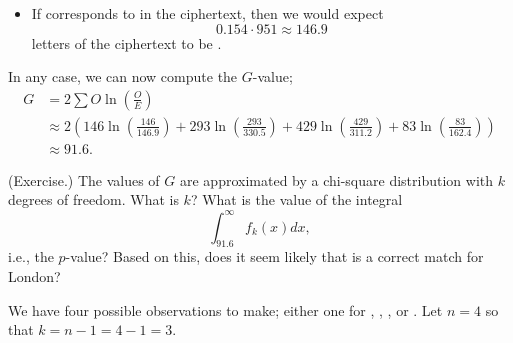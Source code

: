 \documentclass[letterpaper]{article}
\begin{document}
\begin{enumerate}
\begin{itemize}
        \item If  corresponds to  in the ciphertext, then we would expect \[0.154 \cdot 951 \approx 146.9\] letters of the ciphertext to be . 
    \end{itemize}
    In any case, we can now compute the $G$-value; 
    \begin{equation*}
        \begin{aligned}
            G &= 2 \sum O\ln\left(\frac{O}{E}\right) \\ 
                &\approx 2\left(146 \ln\left(\frac{146}{146.9}\right) + 293 \ln\left(\frac{293}{330.5}\right) + 429 \ln\left(\frac{429}{311.2}\right) + 83 \ln\left(\frac{83}{162.4}\right) \right) \\ 
                &\approx 91.6.
        \end{aligned}
    \end{equation*}

    \begin{mdframed}
        (Exercise.) The values of $G$ are approximated by a chi-square distribution with $k$ degrees of freedom. What is $k$? What is the value of the integral \[\int_{91.6}^{\infty} f_{k}(x) dx,\] i.e., the $p$-value? Based on this, does it seem likely that  is a correct match for London? 
        \begin{mdframed}
            We have four possible observations to make; either one for , , , or . Let $n = 4$ so that $k = n - 1 = 4 - 1 = 3$.
        \end{mdframed}
    \end{mdframed}


\end{enumerate}
\end{document}
